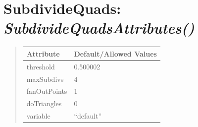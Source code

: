 \documentclass[letterpaper,10pt,english]{sphinxmanual}
\begin{document}
\begin{DUlineblock}{0em}
\item[] 
\end{DUlineblock}


\section{\textbf{SubdivideQuads}: \emph{SubdivideQuadsAttributes()}}
\label{attributes:subdividequads-subdividequadsattributes}
\begin{DUlineblock}{0em}
\item[] 
\end{DUlineblock}
\begin{quote}

\begin{tabulary}{\linewidth}{|L|L|}
\hline

\textbf{Attribute}
 & 
\textbf{Default/Allowed Values}
\\
\hline
threshold
 & 
0.500002
\\
\hline
maxSubdivs
 & 
4
\\
\hline
fanOutPoints
 & 
1
\\
\hline
doTriangles
 & 
0
\\
\hline
variable
 & 
``default''
\\
\hline\end{tabulary}

\end{quote}

\begin{DUlineblock}{0em}
\item[] 
\end{DUlineblock}

\begin{DUlineblock}{0em}
\item[] 
\end{DUlineblock}
\end{document}
